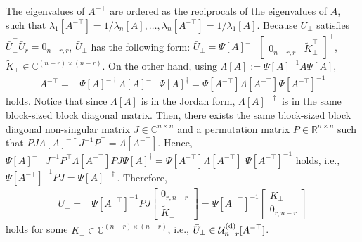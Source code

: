 \documentclass{ifacconf}
\begin{document}
\begin{pf}
The eigenvalues of $A^{-\top}$ are ordered as the reciprocals of the eigenvalues of $A$, such that $\lambda _{1}[A^{-\top}] = 1/\lambda _{n}[A], \dots , \lambda _{n}[A^{-\top}] = 1/\lambda _{1}[A]$. 
Because $\bar{U}_{\perp}$ satisfies $\bar{U}_{\perp}^{\top} \bar{U}_{r} = 0_{n-r,r}$, $\bar{U}_{\perp}$ has the following form: $\bar{U}_{\perp} = \Psi [A]^{-\dagger} \begin{bmatrix} 0_{n-r,r} & \tilde{K}_{\perp}^{\top} \end{bmatrix} ^{\top}$, $\tilde{K}_{\perp} \in \mathbb{C}^{(n-r) \times (n-r)}$. 
On the other hand, using $\Lambda [A] := \Psi [A]^{-1} A \Psi [A] $, 
\begin{align*}
A^{-\top}  =& \Psi [A] ^{-\dagger} \Lambda [A]^{-\dagger} \Psi [A] ^{\dagger}
= \Psi [A^{-\top}]  \Lambda [A^{-\top}] \Psi [A^{-\top}] ^{-1}
\end{align*}
holds. 
Notice that since $\Lambda [A]$ is in the Jordan form, $\Lambda [A]^{-\dagger}$ is in the same block-sized block diagonal matrix. 
Then, there exists the same block-sized block diagonal non-singular matrix $J \in \mathbb{C}^{n\times n}$ and a permutation matrix $P \in \mathbb{R}^{n\times n}$ such that $P J \Lambda [A]^{-\dagger} J^{-1}P^{\top} = \Lambda [A^{-\top}] $.  
Hence, $\Psi [A] ^{-\dagger} J^{-1} P^{\top} \Lambda [A^{-\top}] P J \Psi [A] ^{\dagger} = \Psi [A^{-\top}]  \Lambda [A^{-\top}]$ $\Psi [A^{-\top}] ^{-1}$
holds, i.e., $\Psi [A^{-\top}] ^{-1} P J = \Psi [A] ^{-\dagger} $. Therefore, 
\begin{align*}
\bar{U}_{\perp} =& \Psi [A^{-\top}] ^{-1} P J \begin{bmatrix} 0_{r,n-r} \\ \tilde{K}_{\perp} \end{bmatrix}
=
\Psi [A^{-\top}] ^{-1} \begin{bmatrix} K_{\perp} \\ 0_{r,n-r} \end{bmatrix}
\end{align*}
holds for some $K_{\perp} \in \mathbb{C}^{(n-r)\times (n-r)}$, i.e., $\bar{U}_{\perp} \in \mathcal{U}_{n-r}^{\rm (d)}[A^{-\top}]$. 
%
\end{pf}
\end{document}
